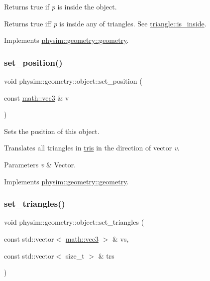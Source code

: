 Returns true if {\itshape p} is inside the object. 

Returns true iff {\itshape p} is inside any of triangles. See \hyperlink{classphysim_1_1geometry_1_1triangle_aa63eb64a152db96607423c9c30e5dd01}{triangle\+::is\+\_\+inside}. 

Implements \hyperlink{classphysim_1_1geometry_1_1geometry_a8ae67bba78a06e3c41b7f5b5903b897d}{physim\+::geometry\+::geometry}.

\mbox{\label{classphysim_1_1geometry_1_1object_a45f72ec911732fc475c9264386626cfe}} 
\subsubsection{\texorpdfstring{set\+\_\+position()}{set\_position()}}
{\footnotesize\ttfamily void physim\+::geometry\+::object\+::set\+\_\+position (\begin{DoxyParamCaption}\item[{const \hyperlink{structphysim_1_1math_1_1vec3}{math\+::vec3} \&}]{v }\end{DoxyParamCaption})\hspace{0.3cm}{\ttfamily [virtual]}}



Sets the position of this object. 

Translates all triangles in \hyperlink{classphysim_1_1geometry_1_1object_a90f3fe1ddb784923e9fd5ff8008b2a0b}{tris} in the direction of vector {\itshape v}. 
\begin{DoxyParams}{Parameters}
{\em v} & Vector. \\
\hline
\end{DoxyParams}


Implements \hyperlink{classphysim_1_1geometry_1_1geometry_a45bffd27f5e8d59375762cf7987625e1}{physim\+::geometry\+::geometry}.

\mbox{\label{classphysim_1_1geometry_1_1object_a878847079d75d63f84ee0a515ee9b199}} 
\subsubsection{\texorpdfstring{set\+\_\+triangles()}{set\_triangles()}}
{\footnotesize\ttfamily void physim\+::geometry\+::object\+::set\+\_\+triangles (\begin{DoxyParamCaption}\item[{const std\+::vector$<$ \hyperlink{structphysim_1_1math_1_1vec3}{math\+::vec3} $>$ \&}]{vs,  }\item[{const std\+::vector$<$ size\+\_\+t $>$ \&}]{trs }\end{DoxyParamCaption})}



